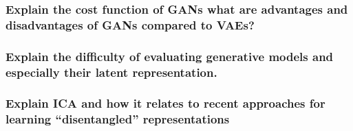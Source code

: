 \documentclass{article}
\begin{document}
\subsubsection{Explain the cost function of GANs what are advantages and disadvantages of GANs compared to VAEs?}

\subsubsection{Explain the difficulty of evaluating generative models and especially their latent representation.}

\subsubsection{Explain ICA and how it relates to recent approaches for learning ``disentangled'' representations}




%
%
\end{document}
